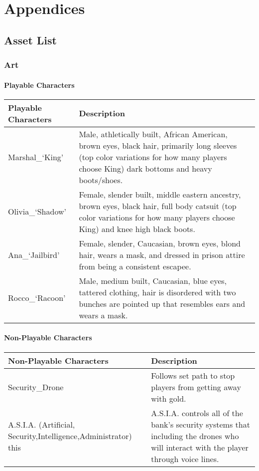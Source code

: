 \documentclass[11pt]{report}
\begin{document}
\chapter{Appendices}

\section{Asset List}

\subsection{Art}

\subsubsection{Playable Characters}

\begin{center}
    \begin{tabular}{| p{.45\linewidth} | p{.45\linewidth}|} 
        \hline
        Playable Characters & Description \\ \hline
        Marshal\_`King'  &   Male, athletically built, African American, brown eyes, black hair, primarily long sleeves (top color variations for how many players choose King) dark bottoms and heavy boots/shoes.  \\ \hline
        Olivia\_`Shadow' &   Female, slender built, middle eastern ancestry, brown eyes, black hair, full body catsuit (top color variations for how many players choose King) and knee high black boots.  \\ \hline
        Ana\_`Jailbird'  &   Female, slender, Caucasian, brown eyes, blond hair, wears a mask, and dressed in prison attire from being a consistent escapee.  \\ \hline
        Rocco\_`Racoon'  &   Male, medium built, Caucasian, blue eyes, tattered clothing, hair is disordered with two bunches are pointed up that resembles ears and wears a mask.  \\
        \hline
    \end{tabular}
\end{center}
    
\subsubsection{Non-Playable Characters}

\begin{center}
    \begin{tabular}{| p{.45\linewidth} | p{.45\linewidth} |}
        \hline    
        Non-Playable Characters &   Description  \\ \hline
        Security\_Drone &    Follows set path to stop players from getting away with gold.  \\ \hline
        A.S.I.A. (Artificial, Security,Intelligence,Administrator) this &   A.S.I.A. controls all of the bank’s security systems that including the drones who will interact with the player through voice lines.  \\
        \hline
    \end{tabular}
\end{center}
\end{document}
